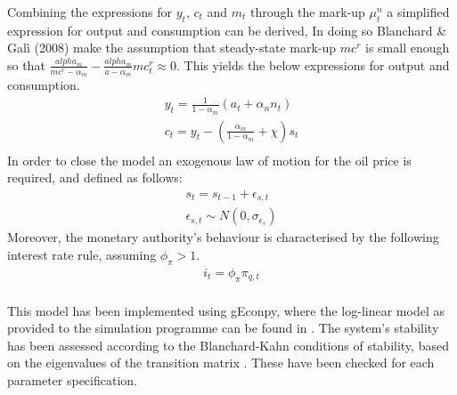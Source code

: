 \documentclass[12pt,a4paper,english]{article} %
\begin{document}
	Combining the expressions for $y_t$, $c_t$ and $m_t$ through the mark-up $\mu_t^n$ a simplified expression for output and consumption can be derived, In doing so Blanchard \& Galì (2008) make the assumption that steady-state mark-up $mc^r$ is small enough so that $\frac{alpha_m}{mc^r - \alpha_m}-\frac{alpha_m}{a - \alpha_m} mc_t^r \approx 0$. This yields the below expressions for output and consumption.
	\begin{equation}
		\begin{aligned}
			y_t = \frac{1}{1-\alpha_m} (a_t + \alpha_n n_t) \\
			c_t = y_t - (\frac{\alpha_m}{1-\alpha_m} + \chi) s_t \\
		\end{aligned}
	\end{equation}
	In order to close the model an exogenous law of motion for the oil price is required, and defined as follows: 
	\begin{equation}
		\begin{aligned}
			s_t = s_{t-1} + \epsilon_{s,t} \\
			\epsilon_{s,t} \sim N(0, \sigma_{\epsilon_{s}})
		\end{aligned}
	\end{equation}
	Moreover, the monetary authority's behaviour is characterised by the following interest rate rule, assuming $\phi_{\pi}>1$. 
	\begin{equation}
		\begin{aligned}
			i_t = \phi_{\pi} \pi_{q,t} \\
		\end{aligned}
	\end{equation}

	This model has been implemented using gEconpy, where the log-linear model as provided to the simulation programme can be found in . The system's stability has been assessed according to the Blanchard-Kahn conditions of stability, based on the eigenvalues of the transition matrix \cite{blanchard_solution_1980}. These have been checked for each parameter specification.	
	
\end{document}
